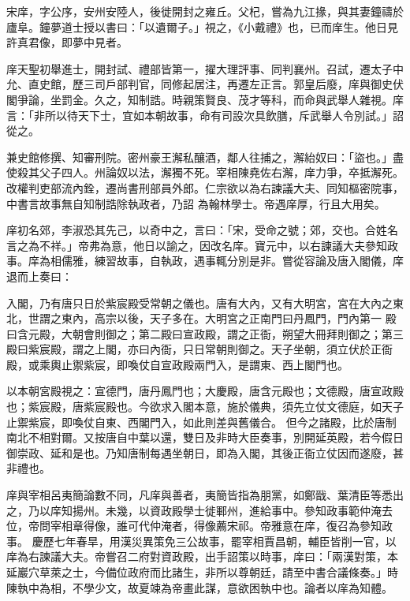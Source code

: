 \begin{pinyinscope}
 宋庠，字公序，安州安陸人，後徙開封之雍丘。父杞，嘗為九江掾，與其妻鐘禱於廬阜。鐘夢道士授以書曰：「以遺爾子。」視之，《小戴禮》也，已而庠生。他日見許真君像，即夢中見者。



 庠天聖初舉進士，開封試、禮部皆第一，擢大理評事、同判襄州。召試，遷太子中允、直史館，歷三司戶部判官，同修起居注，再遷左正言。郭皇后廢，庠與御史伏
 閣爭論，坐罰金。久之，知制誥。時親策賢良、茂才等科，而命與武舉人雜視。庠言：「非所以待天下士，宜如本朝故事，命有司設次具飲膳，斥武舉人令別試。」詔從之。



 兼史館修撰、知審刑院。密州豪王澥私釀酒，鄰人往捕之，澥紿奴曰：「盜也。」盡使殺其父子四人。州論奴以法，澥獨不死。宰相陳堯佐右澥，庠力爭，卒抵澥死。改權判吏部流內銓，遷尚書刑部員外郎。仁宗欲以為右諫議大夫、同知樞密院事，中書言故事無自知制誥除執政者，乃詔
 為翰林學士。帝遇庠厚，行且大用矣。



 庠初名郊，李淑恐其先己，以奇中之，言曰：「宋，受命之號；郊，交也。合姓名言之為不祥。」帝弗為意，他日以諭之，因改名庠。寶元中，以右諫議大夫參知政事。庠為相儒雅，練習故事，自執政，遇事輒分別是非。嘗從容論及唐入閣儀，庠退而上奏曰：



 入閣，乃有唐只日於紫宸殿受常朝之儀也。唐有大內，又有大明宮，宮在大內之東北，世謂之東內，高宗以後，天子多在。大明宮之正南門曰丹鳳門，門內第一
 殿曰含元殿，大朝會則御之；第二殿曰宣政殿，謂之正衙，朔望大冊拜則御之；第三殿曰紫宸殿，謂之上閣，亦曰內衙，只日常朝則御之。天子坐朝，須立伏於正衙殿，或乘輿止禦紫宸，即喚仗自宣政殿兩門入，是謂東、西上閣門也。



 以本朝宮殿視之：宣德門，唐丹鳳門也；大慶殿，唐含元殿也；文德殿，唐宣政殿也；紫宸殿，唐紫宸殿也。今欲求入閣本意，施於儀典，須先立仗文德庭，如天子止禦紫宸，即喚仗自東、西閣門入，如此則差與舊儀合。
 但今之諸殿，比於唐制南北不相對爾。又按唐自中葉以還，雙日及非時大臣奏事，別開延英殿，若今假日御崇政、延和是也。乃知唐制每遇坐朝日，即為入閣，其後正衙立仗因而遂廢，甚非禮也。



 庠與宰相呂夷簡論數不同，凡庠與善者，夷簡皆指為朋黨，如鄭戩、葉清臣等悉出之，乃以庠知揚州。未幾，以資政殿學士徙鄆州，進給事中。參知政事範仲淹去位，帝問宰相章得像，誰可代仲淹者，得像薦宋祁。帝雅意在庠，復召為參知政事。
 慶歷七年春旱，用漢災異策免三公故事，罷宰相賈昌朝，輔臣皆削一官，以庠為右諫議大夫。帝嘗召二府對資政殿，出手詔策以時事，庠曰：「兩漢對策，本延巖穴草萊之士，今備位政府而比諸生，非所以尊朝廷，請至中書合議條奏。」時陳執中為相，不學少文，故夏竦為帝畫此謀，意欲困執中也。論者以庠為知體。




\end{pinyinscope}
